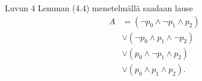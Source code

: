 \documentclass[12pt,a4paper]{article}
\begin{document}
\begin{solution}
Luvun 4 Lemman (4.4) menetelmällä saadaan lause
\[
\begin{aligned}
A &= (\neg p_0 \land \neg p_1 \land p_2) \\
&\lor (\neg p_0 \land p_1 \land \neg p_2) \\
&\lor (p_0 \land \neg p_1 \land p_2) \\
&\lor (p_0 \land p_1 \land p_2).
\end{aligned}
\]
\end{solution}

\begin{exercise}[Haastetehtävä]
\end{exercise}

\begin{solution}
\end{solution}
\end{document}
